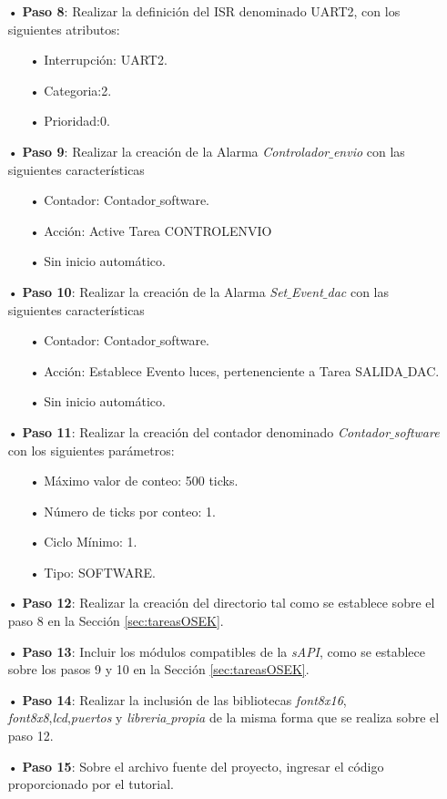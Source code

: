\documentclass[12pt,letterpaper]{article}
\begin{document}
\begin{enumerate}
\item[•]\textbf{Paso 8}: Realizar la definición del ISR denominado UART2, con los siguientes atributos:
\begin{enumerate}
\item[•]Interrupción: UART2.
\item[•]Categoria:2.
\item[•]Prioridad:0.
\end{enumerate}

\item[•]\textbf{Paso 9}: Realizar la creación de la Alarma \textit{Controlador$\_$envio} con las siguientes características
\begin{enumerate}
\item[•]Contador: Contador$\_$software.
\item[•]Acción: Active Tarea CONTROLENVIO
\item[•]Sin inicio automático.
\end{enumerate}

\item[•]\textbf{Paso 10}: Realizar la creación de la Alarma \textit{Set$\_$Event$\_$dac} con las siguientes características
\begin{enumerate}
\item[•]Contador: Contador$\_$software.
\item[•]Acción: Establece Evento luces, pertenenciente a Tarea SALIDA$\_$DAC.
\item[•]Sin inicio automático.
\end{enumerate}

\item[•]\textbf{Paso 11}: Realizar la creación del contador denominado \textit{Contador$\_$software} con los siguientes parámetros:
\begin{enumerate}
\item[•]Máximo valor de conteo: 500 ticks.
\item[•]Número de ticks por conteo: 1. 
\item[•]Ciclo Mínimo: 1.
\item[•]Tipo: SOFTWARE.
\end{enumerate}

\item[•]\textbf{Paso 12}: Realizar la creación del directorio tal como se establece sobre el paso 8 en la Sección \ref{sec:tareasOSEK}.

\item[•]\textbf{Paso 13}: Incluir los módulos compatibles de la \textit{sAPI}, como se establece sobre los pasos 9 y 10 en la Sección \ref{sec:tareasOSEK}.

\item[•]\textbf{Paso 14}: Realizar la inclusión de las bibliotecas \textit{font8x16}, \textit{font8x8},\textit{lcd},\textit{puertos} y \textit{libreria$\_$propia} de la misma forma que se realiza sobre el paso 12.

\item[•]\textbf{Paso 15}: Sobre el archivo fuente del proyecto, ingresar el código proporcionado por el tutorial.

\end{enumerate}
\end{document}
